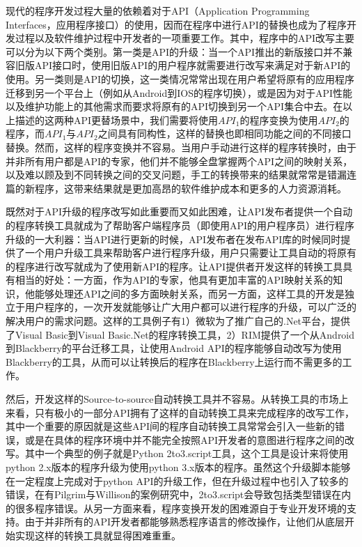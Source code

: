 
现代的程序开发过程大量的依赖着对于API（Application Programming Interfaces，应用程序接口）的使用，因而在程序中进行API的替换也成为了程序开发过程以及软件维护过程中开发者的一项重要工作。其中，程序中的API改写主要可以分为以下两个类别。第一类是API的升级：当一个API推出的新版接口并不兼容旧版API接口时，使用旧版API的用户程序就需要进行改写来满足对于新API的使用。另一类则是API的切换，这一类情况常常出现在用户希望将原有的应用程序迁移到另一个平台上（例如从Android到IOS的程序切换），或是因为对于API性能以及维护功能上的其他需求而要求将原有的API切换到另一个API集合中去。在以上描述的这两种API更替场景中，我们需要将使用$API_1$的程序变换为使用$API_2$的程序，而$API_1$与$API_2$之间具有同构性，这样的替换也即相同功能之间的不同接口替换。然而，这样的程序变换并不容易。当用户手动进行这样的程序转换时，由于并非所有用户都是API的专家，他们并不能够全盘掌握两个API之间的映射关系，以及难以顾及到不同转换之间的交叉问题，手工的转换带来的结果就常常是错漏连篇的新程序，这带来结果就是更加高昂的软件维护成本和更多的人力资源消耗。

既然对于API升级的程序改写如此重要而又如此困难，让API发布者提供一个自动的程序转换工具就成为了帮助客户端程序员（即使用API的用户程序员）进行程序升级的一大利器：当API进行更新的时候，API发布者在发布API库的时候同时提供了一个用户升级工具来帮助客户进行程序升级，用户只需要让工具自动的将原有的程序进行改写就成为了使用新API的程序。让API提供者开发这样的转换工具具有相当的好处：一方面，作为API的专家，他具有更加丰富的API映射关系的知识，他能够处理还API之间的多方面映射关系，而另一方面，这样工具的开发是独立于用户程序的，一次开发就能够让广大用户都可以进行程序的升级，可以广泛的解决用户的需求问题。这样的工具例子有1）微软为了推广自己的.Net平台，提供了Visual Basic到Visual Basic.Net的程序转换工具，2）RIM提供了一个从Android到Blackberry的平台迁移工具，让使用Android API的程序能够自动改写为使用Blackberry的工具，从而可以让转换后的程序在Blackberry上运行而不需更多的工作。

然后，开发这样的Source-to-source自动转换工具并不容易。从转换工具的市场上来看，只有极小的一部分API拥有了这样的自动转换工具来完成程序的改写工作，其中一个重要的原因就是这些API间的程序自动转换工具常常会引入一些新的错误，或是在具体的程序环境中并不能完全按照API开发者的意图进行程序之间的改写。其中一个典型的例子就是Python 2to3.script工具，这个工具是设计来将使用python 2.x版本的程序升级为使用python 3.x版本的程序。虽然这个升级脚本能够在一定程度上完成对于python API的升级工作，但在升级过程中也引入了较多的错误，在有Pilgrim与Willison的案例研究\cite{python}中，2to3.script会导致包括类型错误在内的很多程序错误。从另一方面来看，程序变换开发的困难源自于专业开发环境的支持。由于并非所有的API开发者都能够熟悉程序语言的修改操作，让他们从底层开始实现这样的转换工具就显得困难重重。

